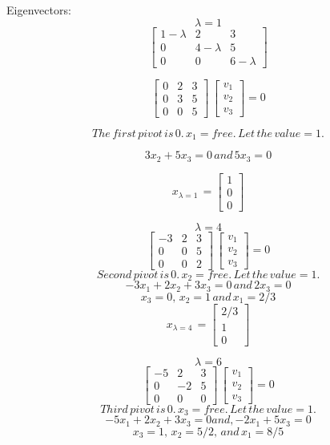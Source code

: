 \documentclass[]{article}
\begin{document}
Eigenvectors:\\
\[\lambda=1\]
\[ \begin{bmatrix}1-\lambda & 2 & 3 \\0 & 4-\lambda & 5 \\0 & 0 & 6-\lambda \end{bmatrix}\]

\[ \begin{bmatrix}0 & 2 & 3 \\0 & 3 & 5\\0 & 0 & 5\end{bmatrix}\,\begin{bmatrix}v_1 \\v_2 \\v_3\end{bmatrix}=0\]

\[The\,first\,pivot\,is\,0.\,x_1 = free.\,Let\,the\,value=1.\]

\[3 x_2 + 5 x_3 = 0 \,and\, 5 x_3 = 0\]

\[x_{\lambda=1}\,=\begin{bmatrix}1 \\0 \\0\end{bmatrix}\]

\[\lambda=4\]
\[ \begin{bmatrix}-3 & 2 & 3 \\0 & 0 & 5\\0 & 0 & 2\end{bmatrix}\,\begin{bmatrix}v_1 \\v_2 \\v_3\end{bmatrix}=0\]
\[Second\,pivot\,is\, 0.\,x_2=free.\,Let\,the\,value=1.\]
\[-3x_1+2x_2 +3x_3 = 0\,and\, 2x_3 = 0\] \[x_3=0,\,x_2=1\,and\,x_1=2/3\]
\[x_{\lambda=4}\,=\begin{bmatrix}2/3\\1 \\0\end{bmatrix}\]

\[\lambda=6\]
\[ \begin{bmatrix}-5 & 2 & 3\\0 & -2 & 5\\0 & 0 & 0\end{bmatrix}\,\begin{bmatrix}v_1 \\v_2 \\v_3\end{bmatrix}=0\]
\[Third\,pivot\,is\, 0.\,x_3=free.\,Let\,the\,value=1.\]
\[-5x_1 +2x_2 +3x_3 = 0 and, -2x_1+5x_3 = 0\]
\[x_3 = 1,\,x_2 = 5/2,\,and\,x_1=8/5\]
\end{document}
